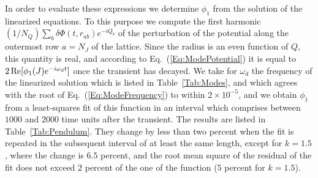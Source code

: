 In order to evaluate these expressions we determine $\phi_1$ from the solution of the linearized equations. To this purpose we compute the first harmonic $(1/N_Q)\sum_b \delta\Phi(t,r_{ab}) e^{-iQ_b}$ of the perturbation of the potential along the outermost row $a = N_J$ of the lattice. Since the radius is an even function of $Q$, this quantity is real, and according to Eq.~(\ref{Eq:ModePotential}) it is equal to $2\,\mbox{Re}[\phi_1(J) e^{-i\omega_d t}]$ once the transient has decayed. We take for $\omega_d$ the frequency of the linearized solution which is listed in Table~\ref{Tab:Modes}, and which agrees with the root of Eq.~(\ref{Eq:ModeFrequency}) to within $2\times 10^{-5}$, and we obtain $\phi_1$ from a least-squares fit of this function in an interval which comprises between $1000$ and $2000$ time units after the transient. The results are listed in Table~\ref{Tab:Pendulum}. They change by less than two percent when the fit is repeated in the subsequent interval of at least the same length, except for $k = 1.5$, where the change is $6.5$ percent, and the root mean square of the residual of the fit does not exceed $2$ percent of the one of the function ($5$ percent for $k = 1.5$).

